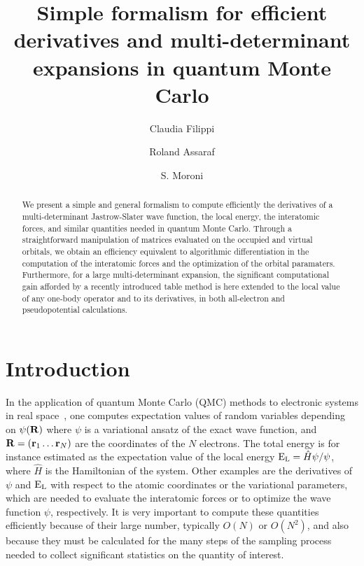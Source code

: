 \documentclass[aip,jcp,reprint,floatfix,onecolumn]{revtex4-1}
\begin{document}
\title{Simple formalism for efficient derivatives and multi-determinant expansions in quantum Monte Carlo}
\author{Claudia Filippi}
\author{Roland Assaraf}
\author{S. Moroni}

\begin{abstract}
We present a simple and general formalism to compute efficiently the derivatives of a multi-determinant Jastrow-Slater wave function, the local energy, the interatomic forces, and similar  quantities needed in quantum Monte Carlo.
Through a straightforward manipulation of matrices evaluated on the occupied and virtual orbitals, we obtain an
efficiency equivalent to algorithmic differentiation in the computation of the interatomic forces and the optimization of the orbital
paramaters. Furthermore, for a large multi-determinant expansion, the significant computational gain afforded by a recently introduced table method is here extended to the local value
of any one-body operator and to its derivatives, in both all-electron and pseudopotential calculations.
\end{abstract}

\maketitle

\section{Introduction}

In the application of quantum Monte Carlo (QMC) methods to electronic systems in real space~\cite{Foulkes01,Kolorenc11}, one
computes expectation values of random
variables depending on $\psi ({\bf R})$ where $\psi$ is a variational ansatz of the exact wave function, and ${\bf R}=({\bf r}_1 \dots {\bf r}_N)$
are the coordinates of the $N$ electrons.  The total energy is for instance estimated as the expectation value of the local energy
${\rm E}_{\rm L}=\hat{H}\psi/\psi$, where $\hat{H}$ is the Hamiltonian of the system. Other examples are the derivatives of $\psi$ and ${\rm E}_{\rm L}$
with respect to the atomic coordinates or the variational parameters, which are needed to evaluate the interatomic forces or to optimize
the wave function $\psi$, respectively.
It is very important to compute these quantities efficiently because of their large number, typically $O(N)$ or $O(N^2)$, and also because
they must be calculated for the many steps of the sampling process needed to collect significant statistics on the quantity of interest.
\end{document}

